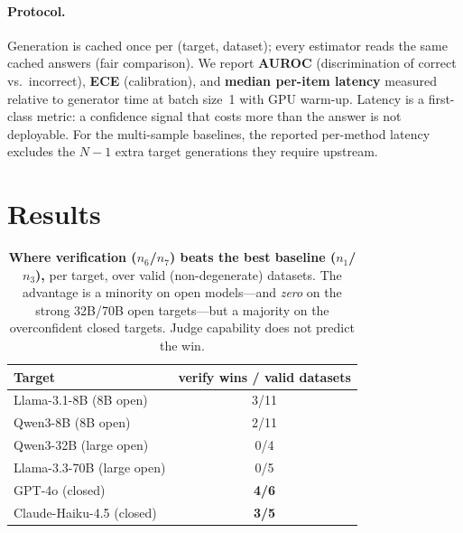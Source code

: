 \documentclass[11pt]{article}
\newcommand{\nverb}{$n_1$}     %
\newcommand{\nphi}{$n_3$}      %
\newcommand{\nyn}{$n_6$}       %
\newcommand{\nsc}{$n_7$}       %
\begin{document}
\paragraph{Protocol.} Generation is cached once per (target, dataset); every estimator
reads the same cached answers (fair comparison). We report \textbf{AUROC} (discrimination
of correct vs.\ incorrect), \textbf{ECE} (calibration), and \textbf{median per-item
latency} measured relative to generator time at batch size~1 with GPU warm-up. Latency is
a first-class metric: a confidence signal that costs more than the answer is not
deployable. For the multi-sample baselines, the reported per-method latency excludes the
$N{-}1$ extra target generations they require upstream.

\section{Results}\label{sec:results}

\begin{table}[t]
\centering\small
\begin{tabular}{lc}
\toprule
Target & verify wins / valid datasets \\
\midrule
Llama-3.1-8B (8B open)   & 3/11 \\
Qwen3-8B (8B open)       & 2/11 \\
Qwen3-32B (large open)   & 0/4 \\
Llama-3.3-70B (large open) & 0/5 \\
GPT-4o (closed)          & \textbf{4/6} \\
Claude-Haiku-4.5 (closed) & \textbf{3/5} \\
\bottomrule
\end{tabular}
\caption{\textbf{Where verification (\nyn/\nsc) beats the best baseline (\nverb/\nphi),}
per target, over valid (non-degenerate) datasets. The advantage is a minority on open
models---and \emph{zero} on the strong 32B/70B open targets---but a majority on the
overconfident closed targets. Judge capability does not predict the win.}
\label{tab:winrate}
\end{table}
\end{document}
